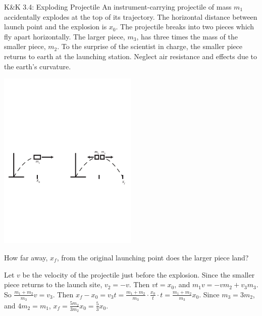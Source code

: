 \documentclass{esg8012pset}
\begin{document}
\begin{problem}{K\&K 3.4: Exploding Projectile}
  An instrument-carrying projectile of mass $m_1$ accidentally explodes at the top of its trajectory. The horizontal distance between launch point and the explosion is $x_0$.  The projectile breaks into two pieces which fly apart horizontally. The larger piece, $m_3$, has three times the mass of the smaller piece, $m_2$. To the surprise of the scientist in charge, the smaller piece returns to earth at the launching station. Neglect air resistance and effects due to the earth's curvature.
  \begin{center}\includegraphics[width=0.5\textwidth]{ps_04_1}\end{center}
  How far away, $x_f$, from the original launching point does the larger piece land?
\end{problem}
\begin{solution}
  Let $v$ be the velocity of the projectile just before the explosion.  Since the smaller piece returns to the launch site, $v_2 = -v$.  Then $v t = x_0$, and $m_1 v = -v m_2 + v_3 m_3$.  So $\frac{m_1+m_2}{m_3} v = v_3$.  Then $x_f - x_0 = v_3 t = \frac{m_1+m_2}{m_3}\cdot \frac{x_0}{t} \cdot t = \frac{m_1+m_2}{m_3}x_0$.  Since $m_3 = 3m_2$, and $4m_2 = m_1$, $x_f = \frac{5m_2}{3m_2}x_0 = \frac{5}{3}x_0$.
\end{solution}
\end{document}
